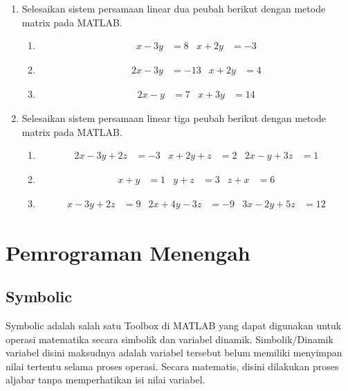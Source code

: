 \documentclass[12pt]{book}
\begin{document}
	\begin{enumerate}
		\item Selesaikan sistem persamaan linear dua peubah berikut dengan metode matrix pada MATLAB.
		\begin{enumerate}[label=(\alph*)]
			\item
			\begin{align*}
				x-3y&=8 & x+2y&=-3
			\end{align*}
		
			\item
			\begin{align*}
				2x-3y&=-13 & x+2y&=4
			\end{align*}
		
			\item
			\begin{align*}
				2x-y&=7 & x+3y&=14
			\end{align*}
		\end{enumerate}
	
		\item Selesaikan sistem persamaan linear tiga peubah berikut dengan metode matrix pada MATLAB.
		\begin{enumerate}[label=(\alph*)]
			\item 
			\begin{align*}
				2x-3y+2z&=-3 & x+2y+z&=2 & 2x-y+3z&=1
			\end{align*}
		
			\item 
			\begin{align*}
				x+y&=1 & y+z&=3 & z+x&=6
			\end{align*}
		
			\item
			\begin{align*}
				x-3y+2z&=9 & 2x+4y-3z&=-9 & 3x-2y+5z&=12
			\end{align*}
		\end{enumerate}
	\end{enumerate}

	\newpage
	\chapter{Pemrograman Menengah}

	\section{Symbolic}
	
	Symbolic adalah salah satu Toolbox di MATLAB yang dapat digunakan untuk operasi matematika secara simbolik dan variabel dinamik.
	Simbolik/Dinamik variabel disini maksudnya adalah variabel tersebut belum memiliki menyimpan nilai tertentu selama proses operasi.
	Secara matematis, disini dilakukan proses aljabar tanpa memperhatikan isi nilai variabel.
	
\end{document}
